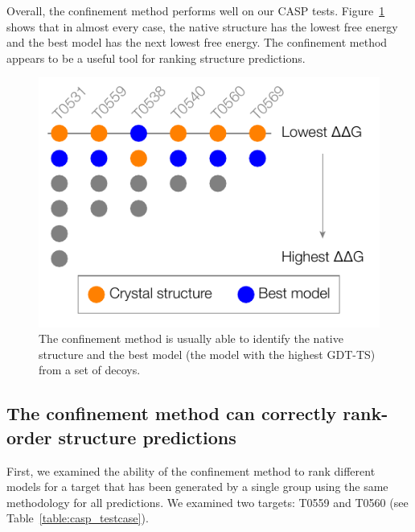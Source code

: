 \documentclass[12pt]{article}
\begin{document}
Overall, the confinement method performs well on our CASP tests. Figure~\ref{fig:summary_casp} shows that in almost
every case, the native structure has the lowest free energy and the best model has the next lowest free energy. The
confinement method appears to be a useful tool for ranking structure predictions.

\begin{figure}
\begin{center}
\includegraphics[width=3.5 in]{casp.pdf}
\end{center}
\caption{The confinement method is usually able to identify the native structure and the best model (the model with the
    highest GDT-TS) from a set of decoys.}
\label{fig:summary_casp}
\end{figure}

\subsection*{The confinement method can correctly rank-order structure predictions}

First, we examined the ability of the confinement method to rank different models for a target that
has been generated
by a single group using the same methodology for all predictions. We examined two targets: T0559 and T0560 (see Table~\ref{table:casp_testcase}). 
\end{document}
